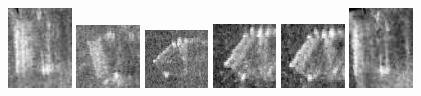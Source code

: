 \begin{figure}
    \includegraphics[width=0.15\textwidth]{chapters/images/dataset/all-class-images/can/can-350.jpg}
    \includegraphics[width=0.15\textwidth]{chapters/images/dataset/all-class-images/can/can-234.jpg}
    \includegraphics[width=0.15\textwidth]{chapters/images/dataset/all-class-images/can/can-21.jpg}
    \includegraphics[width=0.15\textwidth]{chapters/images/dataset/all-class-images/can/can-55.jpg}
    \includegraphics[width=0.15\textwidth]{chapters/images/dataset/all-class-images/can/can-66.jpg}
    \includegraphics[width=0.15\textwidth]{chapters/images/dataset/all-class-images/can/can-363.jpg}
    

\end{figure}
